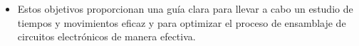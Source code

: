     \begin{itemize}
    \item Estos objetivos proporcionan una guía clara para llevar a cabo un estudio de tiempos y movimientos eficaz y para optimizar el proceso de ensamblaje de circuitos electrónicos de manera efectiva.\cite{Groover}
    \end{itemize}
